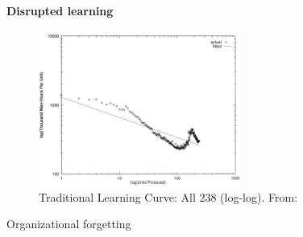 \begin{frame}
	\frametitle{\insertsection}
	\framesubtitle{Disrupted learning}
	\begin{figure}
		\includegraphics[height=5cm]{resources/learning_curve3.jpg}
		\caption{Traditional Learning Curve: All 238 (log-log). From: \citet[p. 1046]{Benkard2000}}
	\end{figure}
\end{frame}

\begin{frame}
	Organizational forgetting
\end{frame}
